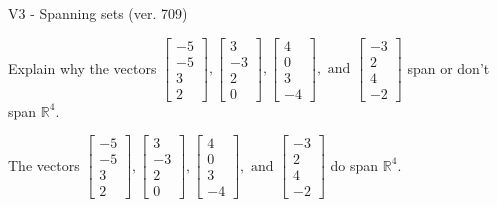 \begin{exercise}
  \begin{exerciseTitle}V3 - Spanning sets (ver. 709)\end{exerciseTitle}
  \begin{exerciseStatement}
    Explain why the vectors \(\left[\begin{array}{r}
-5 \\
-5 \\
3 \\
2
\end{array}\right] , \left[\begin{array}{r}
3 \\
-3 \\
2 \\
0
\end{array}\right] , \left[\begin{array}{r}
4 \\
0 \\
3 \\
-4
\end{array}\right] , \text{ and } \left[\begin{array}{r}
-3 \\
2 \\
4 \\
-2
\end{array}\right]\) span or don't span \(\mathbb{R}^4\). 
	


  \end{exerciseStatement}
  \begin{exerciseAnswer}
   The vectors \(\left[\begin{array}{r}
-5 \\
-5 \\
3 \\
2
\end{array}\right] , \left[\begin{array}{r}
3 \\
-3 \\
2 \\
0
\end{array}\right] , \left[\begin{array}{r}
4 \\
0 \\
3 \\
-4
\end{array}\right] , \text{ and } \left[\begin{array}{r}
-3 \\
2 \\
4 \\
-2
\end{array}\right]\) 
  	 do  
	span \(\mathbb{R}^4\).
  


  \end{exerciseAnswer}
\end{exercise}